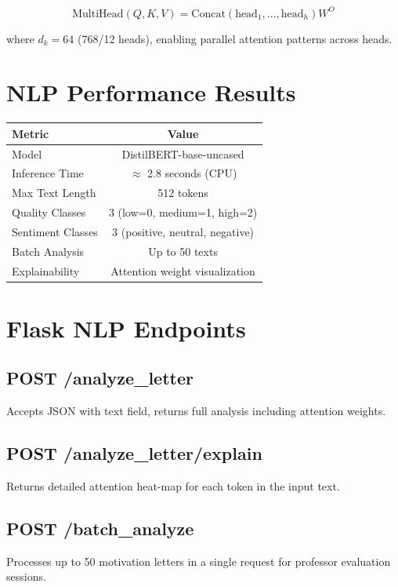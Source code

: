 \documentclass[12pt,a4paper]{report}
\begin{document}
\[
\text{MultiHead}(Q, K, V) = \text{Concat}(\text{head}_1, ..., \text{head}_h) W^O
\]

where $d_k = 64$ (768/12 heads), enabling parallel attention patterns across heads.

\section{NLP Performance Results}

\begin{center}
\begin{tabular}{|l|c|}
\hline
\textbf{Metric} & \textbf{Value} \\
\hline
Model & DistilBERT-base-uncased \\
\hline
Inference Time & $\approx$ 2.8 seconds (CPU) \\
\hline
Max Text Length & 512 tokens \\
\hline
Quality Classes & 3 (low=0, medium=1, high=2) \\
\hline
Sentiment Classes & 3 (positive, neutral, negative) \\
\hline
Batch Analysis & Up to 50 texts \\
\hline
Explainability & Attention weight visualization \\
\hline
\end{tabular}
\end{center}

\section{Flask NLP Endpoints}

\subsection{POST /analyze\_letter}
Accepts JSON with text field, returns full analysis including attention weights.

\subsection{POST /analyze\_letter/explain}
Returns detailed attention heat-map for each token in the input text.

\subsection{POST /batch\_analyze}
Processes up to 50 motivation letters in a single request for professor evaluation sessions.
\end{document}
